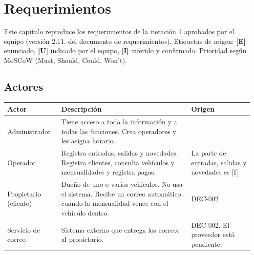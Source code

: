 
\chapter{Requerimientos}\label{cap:requerimientos}

Este capítulo reproduce los requerimientos de la iteración 1 aprobados por el equipo (versión 2.11. del documento de requerimientos). Etiquetas de origen: \textbf{[E]} enunciado, \textbf{[U]} indicado por el equipo, \textbf{[I]} inferido y confirmado. Prioridad según MoSCoW (Must, Should, Could, Won't).

\section{Actores}
\begin{longtable}{>{\raggedright\arraybackslash}p{3.4cm}>{\raggedright\arraybackslash}p{8.2cm}>{\raggedright\arraybackslash}p{2.8cm}}
\toprule
\textbf{Actor} & \textbf{Descripción} & \textbf{Origen}\\
\midrule\endhead
Administrador & Tiene acceso a toda la información y a todas las funciones. Crea operadores y les asigna horario. & [U]\\
Operador & Registra entradas, salidas y novedades. Registra clientes, consulta vehículos y mensualidades y registra pagos. & [U] La parte de entradas, salidas y novedades es [I]\\
Propietario (cliente) & Dueño de uno o varios vehículos. No usa el sistema. Recibe un correo automático cuando la mensualidad vence con el vehículo dentro. & [U] DEC-002\\
Servicio de correo & Sistema externo que entrega los correos al propietario. & DEC-002. El proveedor está pendiente.\\
\bottomrule
\end{longtable}

